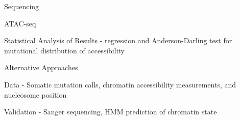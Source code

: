 \begin{outline}
\begin{outline}
\begin{outline}
				\item Sequencing
				\item ATAC-seq
				\item Statistical Analysis of Results - regression and Anderson-Darling test for mutational distribution of accessibility
				\item Alternative Approaches
				\item Data - Somatic mutation calls, chromatin accessibility measurements, and nucleosome position
				\item Validation - Sanger sequencing, HMM prediction of chromatin state
			\end{outline}
	\end{outline}
\end{outline}
\medskip

\printbibliography














